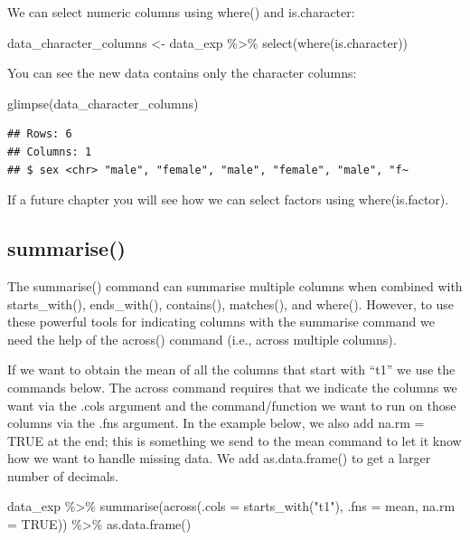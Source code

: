 \documentclass[
]{krantz}
\makeatletter
\newenvironment{Shaded}{\begin{snugshade}}{\end{snugshade}}
\newcommand{\AttributeTok}[1]{\textcolor[rgb]{0.61,0.61,0.61}{#1}}
\newcommand{\ConstantTok}[1]{\textcolor[rgb]{0,0,0}{#1}}
\newcommand{\FunctionTok}[1]{\textcolor[rgb]{0,0,0}{#1}}
\newcommand{\NormalTok}[1]{#1}
\newcommand{\OtherTok}[1]{\textcolor[rgb]{0.37,0.37,0.37}{#1}}
\newcommand{\SpecialCharTok}[1]{\textcolor[rgb]{0,0,0}{#1}}
\newcommand{\StringTok}[1]{\textcolor[rgb]{0.5,0.5,0.5}{#1}}
\newenvironment{kframe}{%
\medskip{}
\setlength{\fboxsep}{.8em}
 \def\at@end@of@kframe{}%
 \ifinner\ifhmode%
  \def\at@end@of@kframe{\end{minipage}}%
  \begin{minipage}{\columnwidth}%
 \fi\fi%
 \def\FrameCommand##1{\hskip\@totalleftmargin \hskip-\fboxsep
 \colorbox{shadecolor}{##1}\hskip-\fboxsep
     \hskip-\linewidth \hskip-\@totalleftmargin \hskip\columnwidth}%
 \MakeFramed {\advance\hsize-\width
   \@totalleftmargin\z@ \linewidth\hsize
   \@setminipage}}%
 {\par\unskip\endMakeFramed%
 \at@end@of@kframe}
\renewenvironment{Shaded}{\begin{kframe}}{\end{kframe}}
\makeatother
\begin{document}
We can select numeric columns using where() and is.character:

\begin{Shaded}
\begin{Highlighting}[]
\NormalTok{data\_character\_columns }\OtherTok{\textless{}{-}}\NormalTok{ data\_exp }\SpecialCharTok{\%\textgreater{}\%} 
  \FunctionTok{select}\NormalTok{(}\FunctionTok{where}\NormalTok{(is.character))}
\end{Highlighting}
\end{Shaded}

You can see the new data contains only the character columns:

\begin{Shaded}
\begin{Highlighting}[]
\FunctionTok{glimpse}\NormalTok{(data\_character\_columns)}
\end{Highlighting}
\end{Shaded}

\begin{verbatim}
## Rows: 6
## Columns: 1
## $ sex <chr> "male", "female", "male", "female", "male", "f~
\end{verbatim}

If a future chapter you will see how we can select factors using where(is.factor).

\hypertarget{summarise-1}{%
\subsection{summarise()}\label{summarise-1}}

The summarise() command can summarise multiple columns when combined with starts\_with(), ends\_with(), contains(), matches(), and where(). However, to use these powerful tools for indicating columns with the summarise command we need the help of the across() command (i.e., across multiple columns).

If we want to obtain the mean of all the columns that start with ``t1'' we use the commands below. The across command requires that we indicate the columns we want via the .cols argument and the command/function we want to run on those columns via the .fns argument. In the example below, we also add na.rm = TRUE at the end; this is something we send to the mean command to let it know how we want to handle missing data. We add as.data.frame() to get a larger number of decimals.

\begin{Shaded}
\begin{Highlighting}[]
\NormalTok{data\_exp }\SpecialCharTok{\%\textgreater{}\%}
  \FunctionTok{summarise}\NormalTok{(}\FunctionTok{across}\NormalTok{(}\AttributeTok{.cols =} \FunctionTok{starts\_with}\NormalTok{(}\StringTok{"t1"}\NormalTok{), }
                   \AttributeTok{.fns =}\NormalTok{ mean,}
                   \AttributeTok{na.rm =} \ConstantTok{TRUE}\NormalTok{)) }\SpecialCharTok{\%\textgreater{}\%}
  \FunctionTok{as.data.frame}\NormalTok{()}
\end{Highlighting}
\end{Shaded}
\end{document}
